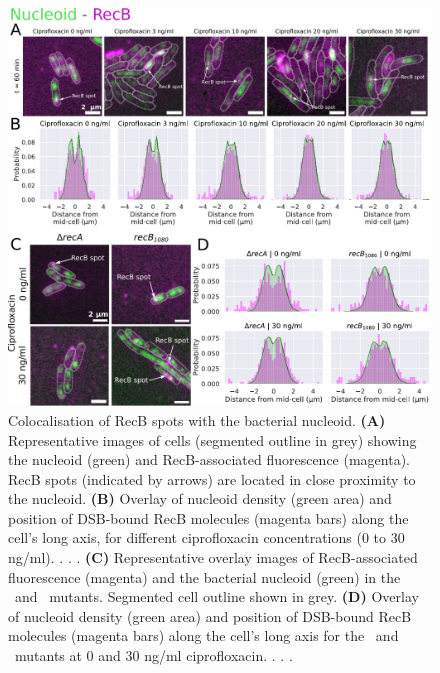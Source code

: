 \begin{figure}[htbp]
    \centering
    \includegraphics[width=.8\textwidth]{Figures/Fig4_nucleoid.pdf}
    \caption{Colocalisation of RecB spots with the bacterial nucleoid. \textbf{(A)} Representative images of cells (segmented outline in grey) showing the nucleoid (green) and RecB-associated fluorescence (magenta). RecB spots (indicated by arrows) are located in close proximity to the nucleoid. \textbf{(B)} Overlay of nucleoid density (green area) and position of DSB-bound RecB molecules (magenta bars) along the cell's long axis, for different ciprofloxacin concentrations (0 to 30 ng/ml). . . . \textbf{(C)} Representative overlay images of RecB-associated fluorescence (magenta) and the bacterial nucleoid (green) in the \dreca\ and \geneteneighty\ mutants. Segmented cell outline shown in grey. \textbf{(D)} Overlay of nucleoid density (green area) and position of DSB-bound RecB molecules (magenta bars) along the cell's long axis for the \dreca\ and \geneteneighty\ mutants at 0 and 30 ng/ml ciprofloxacin. . . .}
    \label{Fig:nucleoid}
\end{figure}

